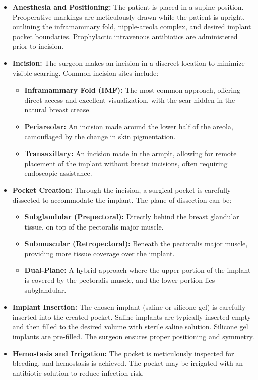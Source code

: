 \begin{itemize}
  \item \textbf{Anesthesia and Positioning:} The patient is placed in a supine position. Preoperative markings are meticulously drawn while the patient is upright, outlining the inframammary fold, nipple-areola complex, and desired implant pocket boundaries. Prophylactic intravenous antibiotics are administered prior to incision.
  \item \textbf{Incision:} The surgeon makes an incision in a discreet location to minimize visible scarring. Common incision sites include:
    \begin{itemize}
      \item \textbf{Inframammary Fold (IMF):} The most common approach, offering direct access and excellent visualization, with the scar hidden in the natural breast crease.
      \item \textbf{Periareolar:} An incision made around the lower half of the areola, camouflaged by the change in skin pigmentation.
      \item \textbf{Transaxillary:} An incision made in the armpit, allowing for remote placement of the implant without breast incisions, often requiring endoscopic assistance.
    \end{itemize}
  \item \textbf{Pocket Creation:} Through the incision, a surgical pocket is carefully dissected to accommodate the implant. The plane of dissection can be:
    \begin{itemize}
      \item \textbf{Subglandular (Prepectoral):} Directly behind the breast glandular tissue, on top of the pectoralis major muscle.
      \item \textbf{Submuscular (Retropectoral):} Beneath the pectoralis major muscle, providing more tissue coverage over the implant.
      \item \textbf{Dual-Plane:} A hybrid approach where the upper portion of the implant is covered by the pectoralis muscle, and the lower portion lies subglandular.
    \end{itemize}
  \item \textbf{Implant Insertion:} The chosen implant (saline or silicone gel) is carefully inserted into the created pocket. Saline implants are typically inserted empty and then filled to the desired volume with sterile saline solution. Silicone gel implants are pre-filled. The surgeon ensures proper positioning and symmetry.
  \item \textbf{Hemostasis and Irrigation:} The pocket is meticulously inspected for bleeding, and hemostasis is achieved. The pocket may be irrigated with an antibiotic solution to reduce infection risk.

\end{itemize}
